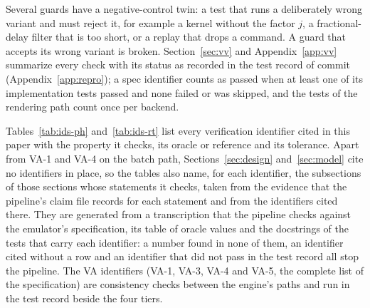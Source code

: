 Several guards have a negative-control twin: a test that runs a deliberately
wrong variant and must reject it, for example a kernel without the factor $j$, a
fractional-delay filter that is too short, or a replay that drops a command. A guard that accepts its wrong
variant is broken. Section~\ref{sec:vv} and Appendix~\ref{app:vv} summarize every check with
its status as recorded in the test record of commit \txtProvTestCommit{}
(Appendix~\ref{app:repro}); a spec identifier counts as
passed when at least one of its implementation tests passed and none failed or was skipped,
and the tests of the rendering path count once per backend.

Tables~\ref{tab:ids-ph} and~\ref{tab:ids-rt} list every verification
identifier cited in this paper with the property it checks, its oracle or reference and its
tolerance. Apart from VA-1 and VA-4 on the batch path, Sections~\ref{sec:design}
and~\ref{sec:model} cite no identifiers in place, so the tables also name, for each identifier, the subsections of
those sections whose statements it checks, taken from the evidence that the pipeline's claim
file records for each statement and from the identifiers cited there. They are generated from a transcription that the pipeline checks against the
emulator's specification, its table of oracle values and the docstrings of the tests that
carry each identifier: a number found in none of them, an identifier cited without a row and
an identifier that did not pass in the test record all stop the pipeline. The VA identifiers
(VA-1, VA-3, VA-4 and VA-5, the complete list of the specification) are consistency checks between
the engine's paths and run in the test record beside the four tiers.




